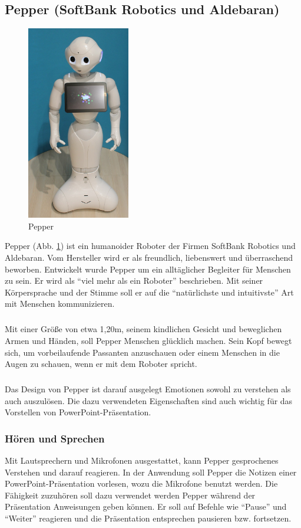 \subsection{Pepper (SoftBank Robotics und Aldebaran)}\label{sec:pepper}
\begin{figure}
  \centering  
     \includegraphics[width=0.4\textwidth]{pepper}
  \caption{Pepper \cite{AbbildungPepper}}
  \label{fig:pepper}
\end{figure}
Pepper (Abb. \ref{fig:pepper}) ist ein humanoider Roboter der Firmen SoftBank
Robotics und Aldebaran.
Vom Hersteller wird er als freundlich, liebenswert und überraschend beworben.
Entwickelt wurde Pepper um ein alltäglicher Begleiter für Menschen zu sein. Er
wird als "`viel mehr als ein Roboter"' beschrieben. Mit seiner Körpersprache und
der Stimme soll er auf die "`natürlichste und intuitivste"' Art mit Menschen
kommunizieren. \cite{SoftBank2018}

\subparagraph{}
Mit einer Größe von etwa 1,20m, seinem kindlichen Gesicht und beweglichen Armen
und Händen, soll Pepper Menschen glücklich machen. Sein Kopf bewegt sich, um
vorbeilaufende Passanten anzuschauen oder einem Menschen in die Augen zu
schauen, wenn er mit dem Roboter spricht. \cite{Markowitz2015}

\subparagraph{}
Das Design von Pepper ist darauf ausgelegt Emotionen sowohl zu verstehen als
auch auszulösen. Die dazu verwendeten Eigenschaften sind auch wichtig für das
Vorstellen von PowerPoint-Präsentation.

\subsubsection{Hören und Sprechen}\label{sec:hoeren-und-sehen}
Mit Lautsprechern und Mikrofonen ausgestattet, kann Pepper gesprochenes
Verstehen und darauf reagieren. \cite{SoftBankII2018} In der Anwendung soll
Pepper die Notizen einer PowerPoint-Präsentation vorlesen, wozu die Mikrofone benutzt werden. Die
Fähigkeit zuzuhören soll dazu verwendet werden Pepper während der Präsentation
Anweisungen geben können. Er soll auf Befehle wie "`Pause"' und "`Weiter"'
reagieren und die Präsentation entsprechen pausieren bzw. fortsetzen.

